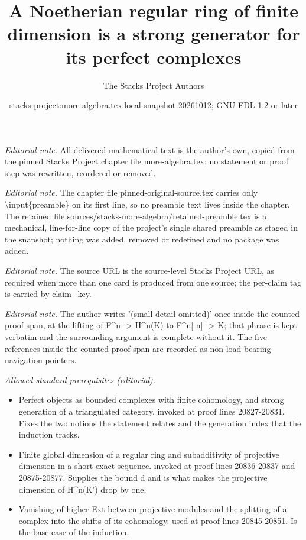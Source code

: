 \documentclass[10pt,a4paper]{amsart}
\title{A Noetherian regular ring of finite dimension is a strong generator for its perfect complexes}
\author{The Stacks Project Authors}
\date{stacks-project:more-algebra.tex:local-snapshot-20261012; GNU FDL 1.2 or later}
\theoremstyle{plain}
\theoremstyle{definition}
\theoremstyle{remark}
\numberwithin{equation}{subsection}
\begin{document}
\maketitle
\setcounter{subsection}{1}
\noindent\textit{Editorial note.} All delivered mathematical text is the author's own, copied from the pinned Stacks Project chapter file more-algebra.tex; no statement or proof step was rewritten, reordered or removed.\par\medskip
\noindent\textit{Editorial note.} The chapter file pinned-original-source.tex carries only \textbackslash{}input\{preamble\} on its first line, so no preamble text lives inside the chapter. The retained file sources/stacks-more-algebra/retained-preamble.tex is a mechanical, line-for-line copy of the project's single shared preamble as staged in the snapshot; nothing was added, removed or redefined and no package was added.\par\medskip
\noindent\textit{Editorial note.} The source URL is the source-level Stacks Project URL, as required when more than one card is produced from one source; the per-claim tag is carried by claim\_key.\par\medskip
\noindent\textit{Editorial note.} The author writes '(small detail omitted)' once inside the counted proof span, at the lifting of F\textasciicircum{}n -> H\textasciicircum{}n(K) to F\textasciicircum{}n[-n] -> K; that phrase is kept verbatim and the surrounding argument is complete without it. The five references inside the counted proof span are recorded as non-load-bearing navigation pointers.\par\medskip
\noindent\textit{Allowed standard prerequisites (editorial).}\begin{itemize}
\item Perfect objects as bounded complexes with finite cohomology, and strong generation of a triangulated category. invoked at proof lines 20827-20831. Fixes the two notions the statement relates and the generation index that the induction tracks.
\item Finite global dimension of a regular ring and subadditivity of projective dimension in a short exact sequence. invoked at proof lines 20836-20837 and 20875-20877. Supplies the bound d and is what makes the projective dimension of H\textasciicircum{}n(K') drop by one.
\item Vanishing of higher Ext between projective modules and the splitting of a complex into the shifts of its cohomology. used at proof lines 20845-20851. Is the base case of the induction.
\end{itemize}\medskip
\end{document}
